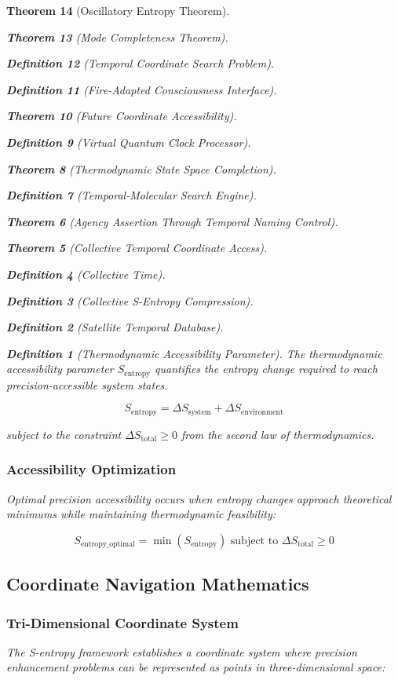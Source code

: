 \documentclass[12pt,a4paper]{article}
\newtheorem{theorem}{Theorem}[section]
\newtheorem{definition}[theorem]{Definition}
\begin{document}
\begin{theorem}[Oscillatory Entropy Theorem]
\begin{theorem}[Mode Completeness Theorem]
\begin{enumerate}
\begin{definition}[Temporal Coordinate Search Problem]
\begin{algorithm}
\begin{definition}[Fire-Adapted Consciousness Interface]
\begin{theorem}[Future Coordinate Accessibility]
\begin{definition}[Virtual Quantum Clock Processor]
\begin{itemize}
\begin{itemize}
\begin{theorem}[Thermodynamic State Space Completion]
\begin{definition}[Temporal-Molecular Search Engine]
\begin{theorem}[Agency Assertion Through Temporal Naming Control]
\begin{remark}
\begin{theorem}[Collective Temporal Coordinate Access]
\begin{definition}[Collective Time]
\begin{definition}[Collective S-Entropy Compression]
\begin{definition}[Satellite Temporal Database]
\begin{algorithm}
\begin{table}[h]
{{\begin{definition}[Thermodynamic Accessibility Parameter]
The thermodynamic accessibility parameter $S_{\text{entropy}}$ quantifies the entropy change required to reach precision-accessible system states.
\end{definition}

\begin{equation}
S_{\text{entropy}} = \Delta S_{\text{system}} + \Delta S_{\text{environment}}
\label{eq:thermodynamic_accessibility}
\end{equation}

subject to the constraint $\Delta S_{\text{total}} \geq 0$ from the second law of thermodynamics.

\subsubsection{Accessibility Optimization}

Optimal precision accessibility occurs when entropy changes approach theoretical minimums while maintaining thermodynamic feasibility:

\begin{equation}
S_{\text{entropy\_optimal}} = \min\left(S_{\text{entropy}}\right) \text{ subject to } \Delta S_{\text{total}} \geq 0
\label{eq:entropy_optimization}
\end{equation}

\subsection{Coordinate Navigation Mathematics}

\subsubsection{Tri-Dimensional Coordinate System}

The S-entropy framework establishes a coordinate system where precision enhancement problems can be represented as points in three-dimensional space:

}}
\end{table}
\end{algorithm}
\end{definition}
\end{definition}
\end{definition}
\end{theorem}
\end{remark}
\end{theorem}
\end{definition}
\end{theorem}
\end{itemize}
\end{itemize}
\end{definition}
\end{theorem}
\end{definition}
\end{algorithm}
\end{definition}
\end{enumerate}
\end{theorem}
\end{theorem}
\end{document}
